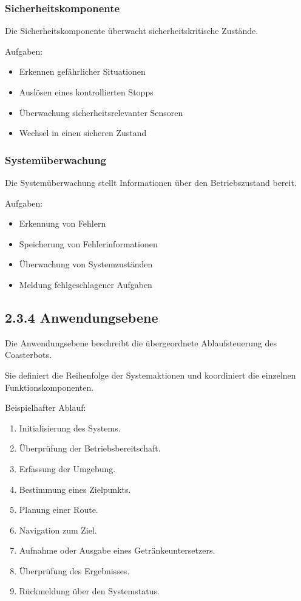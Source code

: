 \documentclass[
  a4paper,
  12pt,
  DIV=12,        %
  parskip=half,  %
  headings=small %
]{scrartcl}
\theoremstyle{definition}
\providecommand{\tightlist}{%
  \setlength{\itemsep}{0pt}\setlength{\parskip}{0pt}}
\theoremstyle{definition}
\providecommand{\tightlist}{%
  \setlength{\itemsep}{0pt}\setlength{\parskip}{0pt}}
\begin{document}
\subsubsection{Sicherheitskomponente}\label{sicherheitskomponente}

Die Sicherheitskomponente überwacht sicherheitskritische Zustände.

Aufgaben:

\begin{itemize}
\tightlist
\item
  Erkennen gefährlicher Situationen
\item
  Auslösen eines kontrollierten Stopps
\item
  Überwachung sicherheitsrelevanter Sensoren
\item
  Wechsel in einen sicheren Zustand
\end{itemize}

\subsubsection{Systemüberwachung}\label{systemuxfcberwachung}

Die Systemüberwachung stellt Informationen über den Betriebszustand
bereit.

Aufgaben:

\begin{itemize}
\tightlist
\item
  Erkennung von Fehlern
\item
  Speicherung von Fehlerinformationen
\item
  Überwachung von Systemzuständen
\item
  Meldung fehlgeschlagener Aufgaben
\end{itemize}

\subsection{2.3.4 Anwendungsebene}\label{anwendungsebene}

Die Anwendungsebene beschreibt die übergeordnete Ablaufsteuerung des
Coasterbots.

Sie definiert die Reihenfolge der Systemaktionen und koordiniert die
einzelnen Funktionskomponenten.

Beispielhafter Ablauf:

\begin{enumerate}
\def\labelenumi{\arabic{enumi}.}
\tightlist
\item
  Initialisierung des Systems.
\item
  Überprüfung der Betriebsbereitschaft.
\item
  Erfassung der Umgebung.
\item
  Bestimmung eines Zielpunkts.
\item
  Planung einer Route.
\item
  Navigation zum Ziel.
\item
  Aufnahme oder Ausgabe eines Getränkeuntersetzers.
\item
  Überprüfung des Ergebnisses.
\item
  Rückmeldung über den Systemstatus.
\end{enumerate}
\end{document}

